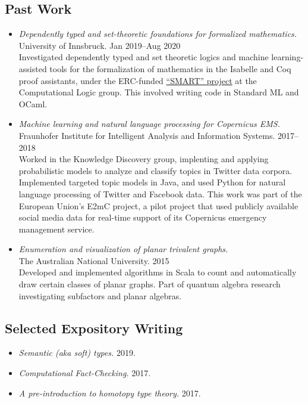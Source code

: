 \documentclass[12pt,a4paper]{article}
\providecommand{\tightlist}{%
  \setlength{\itemsep}{0pt}\setlength{\parskip}{0pt}}
\begin{document}
\subsection{Past Work}

\begin{itemize}
\item
  \emph{Dependently typed and set-theoretic foundations for formalized mathematics.}\\
  University of Innsbruck.\hfill
  Jan 2019--Aug 2020\\[0.8ex]
  Investigated dependently typed and set theoretic logics and machine learning-assisted tools for the formalization of mathematics in the Isabelle and Coq proof assistants, under the ERC-funded \href{https://project-smart.uibk.ac.at}{``SMART'' project} at the Computational Logic group.
  This involved writing code in Standard ML and OCaml.

\item
  \emph{Machine learning and natural language processing for Copernicus EMS.}\\
  Fraunhofer Institute for Intelligent Analysis and Information Systems.\hfill
  2017--2018\\[0.8ex]
  Worked in the Knowledge Discovery group, implenting and applying probabilistic models to analyze and classify topics in Twitter data corpora.
  Implemented targeted topic models in Java, and used Python for natural language processing of Twitter and Facebook data.
  This work was part of the European Union's E2mC project, a pilot project that used publicly available social media data for real-time support of its Copernicus emergency management service.

\item
  \emph{Enumeration and visualization of planar trivalent graphs.}\\
  The Australian National University.\hfill
  2015\\[0.8ex]
  Developed and implemented algorithms in Scala to count and automatically draw certain classes of planar graphs.
  Part of quantum algebra research investigating subfactors and planar algebras.
\end{itemize}

\subsection{Selected Expository Writing}\label{subsec:expo-writing}

\begin{itemize}
\tightlist
\item
  \emph{Semantic (aka soft) types.}
  2019.\hspace{0.5ex}
\item
  \emph{Computational Fact-Checking.}
  2017.\hspace{0.5ex}
\item
  \emph{A pre-introduction to homotopy type theory.}
  2017.\hspace{0.5ex}
\end{itemize}
\end{document}
